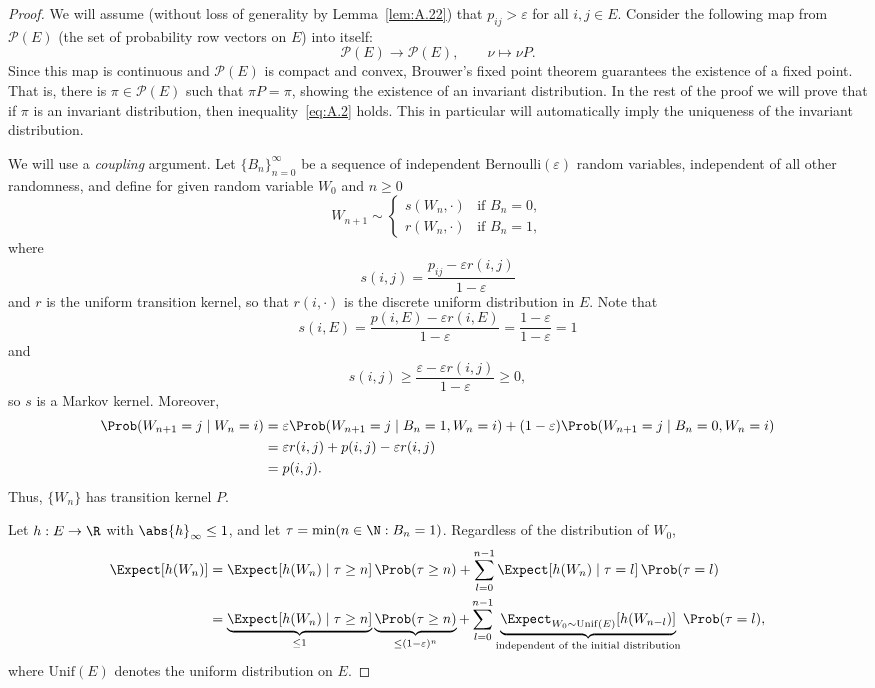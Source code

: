 \begin{proof}
We will assume (without loss of generality by Lemma~\ref{lem:A.22}) that $p_{ij} > \varepsilon$
for all $i, j \in E$.  Consider the following map from $\mathcal{P}(E)$ (the set of probability row
vectors on $E$) into itself:
\[
  \mathcal{P}(E) \to \mathcal{P}(E), \qquad \nu \mapsto \nu P.
\]
Since this map is continuous and $\mathcal{P}(E)$ is compact and convex, Brouwer's fixed point
theorem guarantees the existence of a fixed point.  That is, there is $\pi \in \mathcal{P}(E)$
such that $\pi P = \pi$, showing the existence of an invariant distribution.  In the rest of the
proof we will prove that if $\pi$ is an invariant distribution, then inequality~\eqref{eq:A.2}
holds.  This in particular will automatically imply the uniqueness of the invariant distribution.

We will use a \emph{coupling} argument.  Let $\{B_n\}_{n=0}^\infty$ be a sequence of independent
$\mathrm{Bernoulli}(\varepsilon)$ random variables, independent of all other randomness, and define
for given random variable $W_0$ and $n \geq 0$
\begin{equation}
  W_{n+1} \sim
  \begin{cases}
    s(W_n, \cdot) & \text{if } B_n = 0, \\
    r(W_n, \cdot) & \text{if } B_n = 1,
  \end{cases}
  \label{eq:A.3}
\end{equation}
where
\[
  s(i, j) = \frac{p_{ij} - \varepsilon r(i, j)}{1 - \varepsilon}
\]
and $r$ is the uniform transition kernel, so that $r(i, \cdot)$ is the discrete uniform
distribution in $E$.  Note that
\[
  s(i, E) = \frac{p(i, E) - \varepsilon r(i, E)}{1 - \varepsilon}
           = \frac{1 - \varepsilon}{1 - \varepsilon} = 1
\]
and
\[
  s(i, j) \geq \frac{\varepsilon - \varepsilon r(i, j)}{1 - \varepsilon} \geq 0,
\]
so $s$ is a Markov kernel.  Moreover,
\begin{align*}
  \Prob(W_{n+1} = j \mid W_n = i)
    &= \varepsilon \Prob(W_{n+1} = j \mid B_n = 1, W_n = i)
       + (1 - \varepsilon)\Prob(W_{n+1} = j \mid B_n = 0, W_n = i) \\
    &= \varepsilon r(i, j) + p(i, j) - \varepsilon r(i, j) \\
    &= p(i, j).
\end{align*}
Thus, $\{W_n\}$ has transition kernel $P$.

Let $h : E \to \R$ with $\abs{h}_\infty \leq 1$, and let $\tau = \min(n \in \N : B_n = 1)$.
Regardless of the distribution of $W_0$,
\begin{align*}
  \Expect[h(W_n)]
    &= \Expect[h(W_n) \mid \tau \geq n]\,\Prob(\tau \geq n)
       + \sum_{l=0}^{n-1} \Expect[h(W_n) \mid \tau = l]\,\Prob(\tau = l) \\
    &= \underbrace{\Expect[h(W_n) \mid \tau \geq n]}_{\leq 1}
       \underbrace{\Prob(\tau \geq n)}_{\leq (1-\varepsilon)^n}
       + \sum_{l=0}^{n-1}
         \underbrace{\Expect_{W_0 \sim \mathrm{Unif}(E)}[h(W_{n-l})]}_{\text{independent of the initial distribution}}
         \Prob(\tau = l),
\end{align*}
where $\mathrm{Unif}(E)$ denotes the uniform distribution on $E$.


\end{proof}
